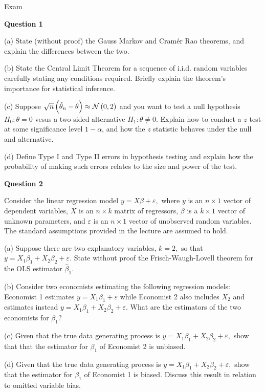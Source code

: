 \documentclass{article}
\begin{document}
\begin{center}
{\Large Exam}\bigskip 
\end{center}

\textbf{Question 1}

(a) State (without proof) the Gauss Markov and Cram\'{e}r Rao theorems, and
explain the differences between the two.

(b) State the Central Limit Theorem for a sequence of i.i.d. random
variables carefully stating any conditions required. Briefly explain the
theorem's importance for statistical inference.

(c) Suppose $\sqrt{n}\left( \hat{\theta}_{n}-\theta \right) \approx \mathcal{%
N}\left( 0,2\right) $ and you want to test a null hypothesis $H_{0}:\theta =0
$ vesus a two-sided alternative $H_{1}:\theta \neq 0.$ Explain how to
conduct a $z$ test at some significance level $1-\alpha $, and how the $z$
statistic behaves under the null and alternative.

(d) Define Type I and Type II errors in hypothesis testing and explain how
the probability of making such errors relates to the size and power of the
test.

\bigskip

\textbf{Question 2}

Consider the linear regression model $y=X\beta +\varepsilon ,$ where $y$ is
an $n\times 1$ vector of dependent variables, $X$ is an $n\times k$ matrix
of regressors, $\beta $ is a $k\times 1$ vector of unknown parameters, and $%
\varepsilon $ is an $n\times 1$ vector of unobserved random variables. The
standard assumptions provided in the lecture are assumed to hold.

(a) Suppose there are two explanatory variables, $k=2,$ so that $%
y=X_{1}\beta _{1}+X_{2}\beta _{2}+\varepsilon .$ State without proof the
Frisch-Waugh-Lovell theorem for the OLS estimator $\hat{\beta}_{1}.$

(b) Consider two economists estimating the following regression models:
Economist 1 estimates $y=X_{1}\beta _{1}+\varepsilon $ while Economist 2
also includes $X_{2}$ and estimates instead $y=X_{1}\beta _{1}+X_{2}\beta
_{2}+\varepsilon .$ What are the estimators of the two economists for $\beta
_{1}$?

(c) Given that the true data generating process is $y=X_{1}\beta
_{1}+X_{2}\beta _{2}+\varepsilon ,$ show that that the estimator for $\beta
_{1}$ of Economist 2 is unbiased.

(d) Given that the true data generating process is $y=X_{1}\beta
_{1}+X_{2}\beta _{2}+\varepsilon ,$ show that the estimator for $\beta _{1}$
of Economist 1 is biased. Discuss this result in relation to omitted
variable bias.
\end{document}
